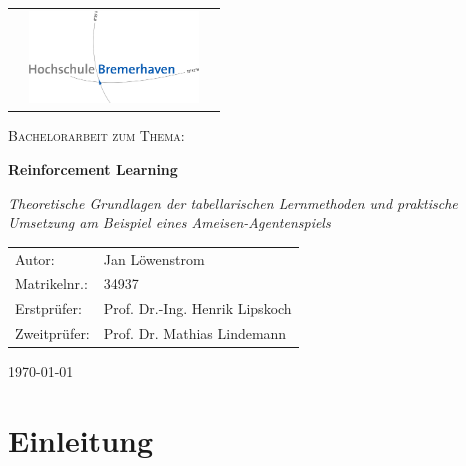 \documentclass[12pt]{scrartcl}
\numberwithin{equation}{section}
\begin{document}
\begin{titlepage}

\thispagestyle{empty}

\begin{tabular}{lcr}
  \hspace{10cm} &
  \includegraphics[width=170px]{images/hb_logo_2c} 
  \vspace{1cm}
\end{tabular}
\par
	\centering	
	\vspace{1cm}
	{\scshape\Large Bachelorarbeit zum Thema:\par}
	\vspace{1.5cm}
	{\huge\bfseries Reinforcement Learning\par}
	\vspace{2cm}
	{\Large\itshape Theoretische Grundlagen der tabellarischen Lernmethoden und praktische Umsetzung am Beispiel eines Ameisen-Agentenspiels
	\par}
	\vfill
	\begin{tabularx}{\textwidth}{lX}
		Autor: & Jan Löwenstrom \\
		Matrikelnr.: & 34937 \\
		Erstprüfer: & Prof. Dr.-Ing. Henrik Lipskoch \\
		Zweitprüfer: & Prof. Dr. Mathias Lindemann \\
	\end{tabularx}  
    \vfill

	{\large \today \par}       
\end{titlepage}
\restoregeometry


\newpage
\setcounter{page}{2}
\tableofcontents
\newpage
\listoffigures
\newpage


\noindent
\section{Einleitung}
\end{document}
